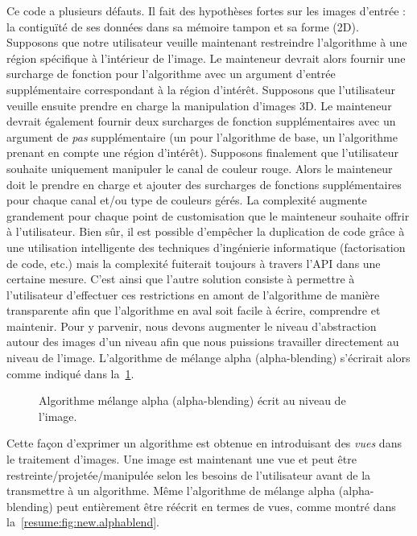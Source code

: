 Ce code a plusieurs défauts. Il fait des hypothèses fortes sur les images d'entrée : la contiguïté de ses données dans
sa mémoire tampon et sa forme (2D). Supposons que notre utilisateur veuille maintenant restreindre l'algorithme à une
région spécifique à l'intérieur de l'image. Le mainteneur devrait alors fournir une surcharge de fonction pour
l'algorithme avec un argument d'entrée supplémentaire correspondant à la région d'intérêt. Supposons que l'utilisateur
veuille ensuite prendre en charge la manipulation d'images 3D. Le mainteneur devrait également fournir deux surcharges
de fonction supplémentaires avec un argument de \emph{pas} supplémentaire (un pour l'algorithme de base, un l'algorithme
prenant en compte une région d'intérêt). Supposons finalement que l'utilisateur souhaite uniquement manipuler le canal
de couleur rouge. Alors le mainteneur doit le prendre en charge et ajouter des surcharges de fonctions supplémentaires
pour chaque canal et/ou type de couleurs gérés. La complexité augmente grandement pour chaque point de customisation que
le mainteneur souhaite offrir à l'utilisateur. Bien sûr, il est possible d'empêcher la duplication de code grâce à une
utilisation intelligente des techniques d'ingénierie informatique (factorisation de code, etc.) mais la complexité
fuiterait toujours à travers l'API dans une certaine mesure. C'est ainsi que l'autre solution consiste à permettre à
l'utilisateur d'effectuer ces restrictions en amont de l'algorithme de manière transparente afin que l'algorithme en
aval soit facile à écrire, comprendre et maintenir. Pour y parvenir, nous devons augmenter le niveau d'abstraction
autour des images d'un niveau afin que nous puissions travailler directement au niveau de l'image. L'algorithme de
mélange alpha (alpha-blending) s'écrirait alors comme indiqué dans la~\cref{resume:fig:view.alphablend}.

\begin{figure}[htbp]
  \centering
  

  \caption[]{Algorithme mélange alpha (alpha-blending) écrit au niveau de l'image.}
  \label{resume:fig:view.alphablend}
\end{figure}

Cette façon d'exprimer un algorithme est obtenue en introduisant des \emph{vues} dans le traitement d'images. Une image
est maintenant une vue et peut être restreinte/projetée/manipulée selon les besoins de l'utilisateur avant de la
transmettre à un algorithme. Même l'algorithme de mélange alpha (alpha-blending) peut entièrement être réécrit en termes
de vues, comme montré dans la~\cref{resume:fig:new.alphablend}.

